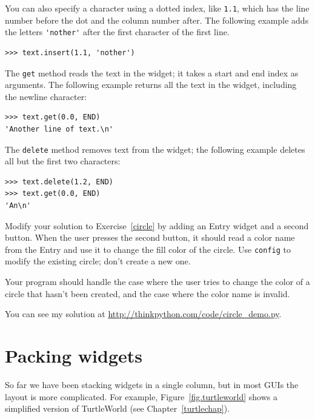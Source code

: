 \documentclass[10pt]{book}
\begin{document}
You can also specify a character using a dotted index, like {\tt 1.1},
which has the line number before the dot and the column number after.
The following example adds the letters \verb"'nother'" after the first
character of the first line.

\begin{verbatim}
>>> text.insert(1.1, 'nother')
\end{verbatim}
%
The {\tt get} method reads the text in the widget; it takes a start
and end index as arguments.  The following example returns all the
text in the widget, including the newline character:

\begin{verbatim}
>>> text.get(0.0, END)
'Another line of text.\n'
\end{verbatim}
%
The {\tt delete} method removes text from the widget;
the following example deletes all but the first two characters:

\begin{verbatim}
>>> text.delete(1.2, END)
>>> text.get(0.0, END)
'An\n'
\end{verbatim}
%

\begin{exercise}
\label{circle2}

Modify your solution to Exercise~\ref{circle} by adding an
Entry widget and a second button.  When the user presses the
second button, it should read a color name from the Entry and
use it to change the fill color of the circle.  Use {\tt config}
to modify the existing circle; don't create a new one.

Your program should handle the case where the user tries to
change the color of a circle that hasn't been created, and
the case where the color name is invalid.

You can see my solution at \url{http://thinkpython.com/code/circle_demo.py}.

\end{exercise}


\section{Packing widgets}

So far we have been stacking widgets in a single column, but in most
GUIs the layout is more complicated.  For example,
Figure~\ref{fig.turtleworld} shows a simplified version of
TurtleWorld (see Chapter~\ref{turtlechap}).
\end{document}
